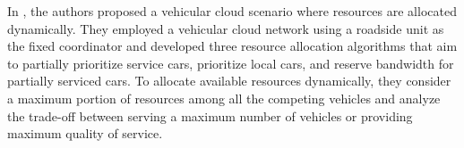\documentclass[electronics,aricle,accept,pdftex,moreauthors]{Definitions/mdpi}
\begin{document}
In \cite{Elahi2021}, the authors proposed a vehicular cloud scenario where resources are allocated dynamically. They employed a vehicular cloud network using a roadside unit as the fixed coordinator and developed three resource allocation algorithms that aim to partially prioritize service cars, prioritize local cars, and reserve bandwidth for partially serviced cars. To allocate available resources dynamically, they consider a maximum portion of resources among all the competing vehicles and analyze the trade-off between serving a maximum number of vehicles or providing maximum quality of service.

\end{document}

